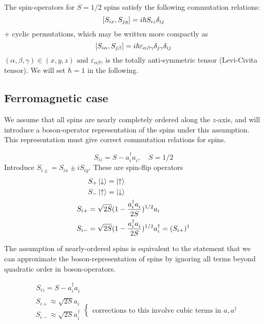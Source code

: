 The spin-operators for $S = 1/2$ spins satisfy the following commutation relations:
\begin{equation}
    \comm{S_{ix}}{S_{jy}} = i\hbar S_{iz}\delta_{ij}
\end{equation}
+ cyclic permutations, which may be written more compactly as
\begin{equation}
    \comm{S_{i\alpha}}{S_{j\beta}} = i\hbar \varepsilon_{\alpha\beta\gamma} \delta_{j\gamma} \delta_{ij} \\
\end{equation}
$(\alpha, \beta, \gamma) \in (x, y, z)  \text{ and } \varepsilon_{\alpha\beta\gamma}$ is the totally anti-symmetric tensor (Levi-Civita tensor). We will set $\hbar = 1$ in the following. \\

\subsection{Ferromagnetic case}
We assume that all spins are nearly completely ordered along the $z$-axis, and will introduce a boson-operator representation of the spins under this assumption. This representation must give correct commutation relations for spins.

\begin{equation}
    S_{iz} = S - a_i^\dagger a_i^{}, \quad S = 1/2
\end{equation}
Introduce $S_{i\pm} = S_{ix} \pm iS_{iy}$. These are spin-flip operators
\begin{align}
    &S_+ \ket{\downarrow} = \ket{\uparrow} \\
    &S_- \ket{\uparrow} = \ket{\downarrow} \\
    S_{i+} &= \sqrt{2S}(1-\frac{a_i^\dagger a_i^{}}{2S})^{1/2}a_i \\
    S_{i-} &= \sqrt{2S}(1-\frac{a_i^\dagger a_i^{}}{2S})^{1/2}a_i^\dagger = (S_{i+})^\dagger
\end{align}

The assumption of nearly-ordered spins is equivalent to the statement that we can approximate the boson-representation of spins by ignoring all terms beyond quadratic order in boson-operators.

\begin{align}
& \ \ S_{iz} = S - a_i^\dagger a_i^{} \\
&\begin{array}{c}
S_{i+} \approx \sqrt{2S}a_i \\
S_{i-} \approx \sqrt{2S}a_i^\dagger \\
\end{array}
\begin{cases}
\text{corrections to this involve cubic terms in } a, a^\dagger 
\end{cases}
\end{align}

